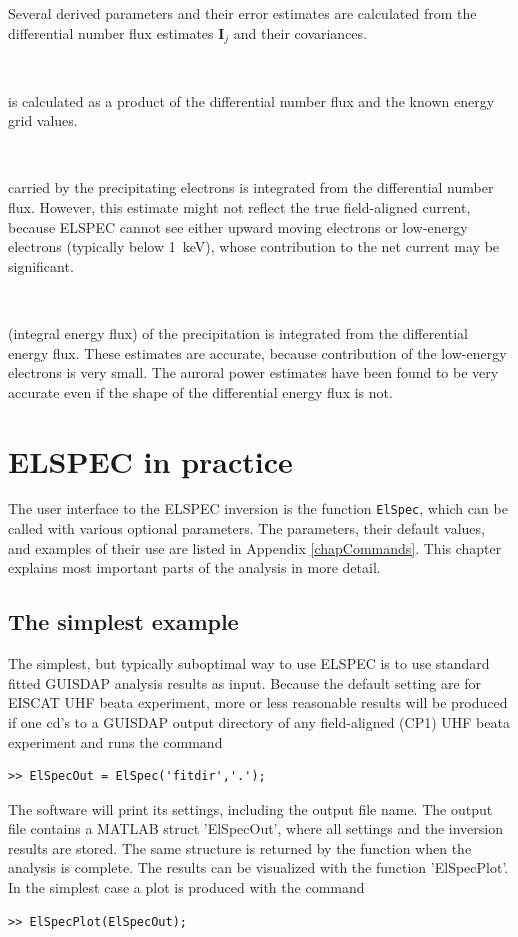 \documentclass[12pt,a4paper]{report}
\begin{document}
Several derived parameters and their error estimates are calculated from the differential number flux estimates $\bm{I}_j$ and their covariances. 

~

 is calculated as a product of the differential number flux and the known energy grid values. 

~

 carried by the precipitating electrons is integrated from the differential number flux. However, this estimate might not reflect the true field-aligned current, because ELSPEC cannot see either upward moving electrons or low-energy electrons (typically below 1~keV), whose contribution to the net current may be significant.

~

 (integral energy flux) of the precipitation is integrated from the differential energy flux. These estimates are accurate, because contribution of the low-energy electrons is very small. The auroral power estimates have been found to be very accurate even if the shape of the differential energy flux is not. 





\chapter{ELSPEC in practice}

The user interface to the ELSPEC inversion is the function \verb|ElSpec|, which can be called with various optional parameters. The parameters, their default values, and examples of their use are listed in Appendix \ref{chapCommands}. This chapter explains most important parts of the analysis in more detail. 


\section{The simplest example}

The simplest, but typically suboptimal way to use ELSPEC is to use standard fitted GUISDAP analysis results as input. Because the default setting are for EISCAT UHF beata experiment, more or less reasonable results will be produced if one cd's to a GUISDAP output directory of any field-aligned (CP1) UHF beata experiment and runs the command
\begin{lstlisting}[style=myMATLAB]
>> ElSpecOut = ElSpec('fitdir','.');
\end{lstlisting}
The software will print its settings, including the output file name. The output file contains a MATLAB struct 'ElSpecOut', where all settings and the inversion results are stored. The same structure is returned by the function when the analysis is complete.  The results can be visualized with the function 'ElSpecPlot'. In the simplest case a plot is produced with the command
\begin{lstlisting}[style=myMATLAB]
>> ElSpecPlot(ElSpecOut);
\end{lstlisting}
\end{document}
